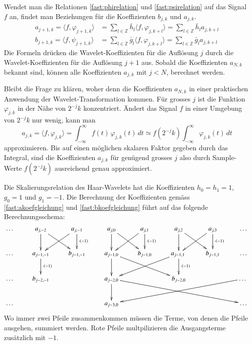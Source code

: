 Wendet man die Relationen \eqref{fast:phirelation} und \eqref{fast:psirelation}
auf das Signal $f$ an, findet man Beziehungen für die
Koeffizienten $b_{j,k}$ und $a_{j,k}$.
\begin{align}
a_{j+1,k}
=
\langle f,\varphi_{j+1,k} \rangle
&=
\sum_{l\in\mathbb Z} \bar{h}_l \langle f,\varphi_{j,k+l}\rangle
=
\sum_{l\in\mathbb Z} \bar{h}_l a_{j,k+l}
\label{fast:akoefgleichung}
\\
b_{j+1,k}
=
\langle f,\psi_{j+1,k} \rangle
&=
\sum_{l\in\mathbb Z} \bar{g}_l \langle f,\varphi_{j,k+l}\rangle
=
\sum_{l\in\mathbb Z} \bar{g}_l a_{j,k+l}
\label{fast:bkoefgleichung}
\end{align}
Die Formeln drücken die Wavelet-Koeffizienten für die Auflösung $j$ durch
die Wavelet-Koeffizienten für die Auflösung $j+1$ aus.
Sobald die Koeffizienten $a_{N,k}$ bekannt sind, können alle Koeffizienten
$a_{j,k}$ mit $j<N$, berechnet werden.

Bleibt die Frage zu klären, woher denn die Koeffizienten $a_{N,k}$ in einer
praktischen Anwendung der Wavelet-Transformation kommen.
Für grosses $j$ ist die Funktion $\varphi_{j,k}$ in der Nähe von $2^{-j}k$
konzentriert.
Ändert das Signal $f$ in einer Umgebung von $2^{-j}k$ nur wenig, kann man
\begin{equation*}
a_{j,k}
=
\langle f,\varphi_{j,k}\rangle
=
\int_{-\infty}^\infty f(t)\, \varphi_{j,k}(t)\,dt
\simeq
f(2^{-j}k)
\int_{-\infty}^\infty \varphi_{j,k}(t)\,dt
\end{equation*}
approximieren.
Bis auf einen möglichen skalaren Faktor gegeben durch das Integral, sind
die Koeffizienten $a_{j,k}$ für genügend grosses $j$ also durch
Sample-Werte $f(2^{-j}k)$ ausreichend genau approximiert.

\begin{beispiel}
Die Skalierungsrelation des Haar-Wavelets hat die Koeffizienten
$h_0=h_1=1$, $g_0=1$ und $g_1=-1$.
Die Berechnung der Koeffizienten gemäss \eqref{fast:akoefgleichung}
und \eqref{fast:bkoefgleichung} führt auf das folgende Berechnungsschema:
\[
\xymatrix{
\dots
	&a_{j,-2} \ar[d] \ar[dr]
		&a_{j,-1} {\color{red}\ar[d]^{\cdot (-1)}} \ar[dl]
			&a_{j,0} \ar[d] \ar[dr]
				&a_{j,1} {\color{red}\ar[d]^{\cdot (-1)}} \ar[dl]
					&a_{j,2} \ar[d] \ar[dr]
						&a_{j,3} {\color{red}\ar[d]^{\cdot (-1)}} \ar[dl]
							&\dots
\\
\dots
	&a_{j-1,-1} {\color{red}\ar[d]^{\cdot(-1)}}
		&b_{j-1,-1}
			&a_{j-1,0}\ar[d] \ar[drr]
				&b_{j-1,0}
					&a_{j-1,1} {\color{red}\ar[d]^{\cdot (-1)}} \ar[dll]
						&b_{j-1,1}
							&\dots
\\
\dots &b_{j-2,-1} 
		&
			&a_{j-2,0} \ar[d] \ar[drrrr]
				&
					&b_{j-2,0}
						&
							&\dots \ar[dllll]
\\
\dots &
		&
			&a_{j-3,0}
				&
					&
						&
							&\dots
}
\]
Wo immer zwei Pfeile zusammenkommen müssen die Terme, von denen die Pfeile ausgehen, 
summiert werden. Rote Pfeile multpilizieren die Ausgangsterme zusätzlich mit $-1$.
\end{beispiel}




